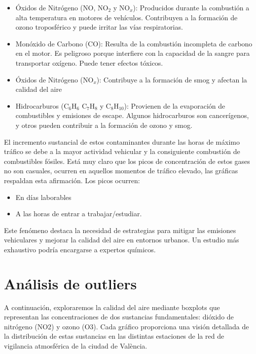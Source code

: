 \documentclass[
]{article}
\providecommand{\tightlist}{%
  \setlength{\itemsep}{0pt}\setlength{\parskip}{0pt}}
\begin{document}
\begin{itemize}
\item
  Óxidos de Nitrógeno (NO, NO\(_2\) y NO\(_x\)): Producidos durante la
  combustión a alta temperatura en motores de vehículos. Contribuyen a
  la formación de ozono troposférico y puede irritar las vías
  respiratorias.
\item
  Monóxido de Carbono (CO): Resulta de la combustión incompleta de
  carbono en el motor. Es peligroso porque interfiere con la capacidad
  de la sangre para transportar oxígeno. Puede tener efectos tóxicos.
\item
  Óxidos de Nitrógeno (NO\(_x\)): Contribuye a la formación de smog y
  afectan la calidad del aire
\item
  Hidrocarburos (C\(_6\)H\(_6\) C\(_7\)H\(_8\) y C\(_8\)H\(_10\)):
  Provienen de la evaporación de combustibles y emisiones de escape.
  Algunos hidrocarburos son cancerígenos, y otros pueden contribuir a la
  formación de ozono y smog.
\end{itemize}

El incremento sustancial de estos contaminantes durante las horas de
máximo tráfico se debe a la mayor actividad vehicular y la consiguiente
combustión de combustibles fósiles. Está muy claro que los picos de
concentración de estos gases no son casuales, ocurren en aquellos
momentos de tráfico elevado, las gráficas respaldan esta afirmación. Los
picos ocurren:

\begin{itemize}
\tightlist
\item
  En días laborables
\item
  A las horas de entrar a trabajar/estudiar.
\end{itemize}

Este fenómeno destaca la necesidad de estrategias para mitigar las
emisiones vehiculares y mejorar la calidad del aire en entornos urbanos.
Un estudio más exhaustivo podría encargarse a expertos químicos.

\hypertarget{anuxe1lisis-de-outliers}{%
\section{Análisis de outliers}\label{anuxe1lisis-de-outliers}}

A continuación, exploraremos la calidad del aire mediante boxplots que
representan las concentraciones de dos sustancias fundamentales: dióxido
de nitrógeno (NO2) y ozono (O3). Cada gráfico proporciona una visión
detallada de la distribución de estas sustancias en las distintas
estaciones de la red de vigilancia atmosférica de la ciudad de València.
\end{document}
